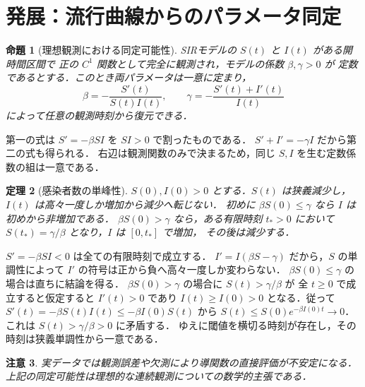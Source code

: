 \documentclass[a5paper,10pt,onecolumn]{jsarticle}
\makeatletter
\theoremstyle{mathnotetheorem}
\newtheorem{theorem}{定理}[section]
\newtheorem{proposition}[theorem]{命題}
\newtheorem{remark}[theorem]{注意}
\renewcommand{\proofname}{証明}
\renewenvironment{proof}[1][\proofname]{%
  \par\pushQED{\qed}\normalfont\topsep4\p@\@plus2\p@\relax
  \trivlist\item[\hskip\labelsep\bfseries #1]\ignorespaces
}{\popQED\endtrivlist\@endpefalse}
\makeatother
\begin{document}
\section{発展：流行曲線からのパラメータ同定}
\begin{proposition}[理想観測における同定可能性]
SIRモデルの $S(t)$ と $I(t)$ がある開時間区間で
正の $C^1$ 関数として完全に観測され，モデルの係数 $\beta,\gamma>0$ が
定数であるとする．このとき両パラメータは一意に定まり，
\[
 \beta=-\frac{S'(t)}{S(t)I(t)},\qquad
 \gamma=-\frac{S'(t)+I'(t)}{I(t)}
\]
によって任意の観測時刻から復元できる．
\end{proposition}
\begin{proof}
第一の式は $S'=-\beta SI$ を $S I>0$ で割ったものである．
$S'+I'=-\gamma I$ だから第二の式も得られる．
右辺は観測関数のみで決まるため，同じ $S,I$ を生む定数係数の組は一意である．
\end{proof}
\begin{theorem}[感染者数の単峰性]
$S(0),I(0)>0$ とする．$S(t)$ は狭義減少し，
$I(t)$ は高々一度しか増加から減少へ転じない．
初めに $\beta S(0)\le\gamma$ なら $I$ は初めから非増加である．
$\beta S(0)>\gamma$ なら，ある有限時刻 $t_*>0$ において
$S(t_*)=\gamma/\beta$ となり，$I$ は $[0,t_*]$ で増加，
その後は減少する．
\end{theorem}
\begin{proof}
$S'=-\beta SI<0$ は全ての有限時刻で成立する．
$I'=I(\beta S-\gamma)$ だから，$S$ の単調性によって
$I'$ の符号は正から負へ高々一度しか変わらない．
$\beta S(0)\le\gamma$ の場合は直ちに結論を得る．
$\beta S(0)>\gamma$ の場合に $S(t)>\gamma/\beta$ が
全 $t\ge0$ で成立すると仮定すると $I'(t)>0$ であり
$I(t)\ge I(0)>0$ となる．従って
$S'(t)=-\beta S(t)I(t)\le-\beta I(0)S(t)$ から
$S(t)\le S(0)e^{-\beta I(0)t}\to0$．
これは $S(t)>\gamma/\beta>0$ に矛盾する．
ゆえに閾値を横切る時刻が存在し，その時刻は狭義単調性から一意である．
\end{proof}
\begin{remark}
実データでは観測誤差や欠測により導関数の直接評価が不安定になる．
上記の同定可能性は理想的な連続観測についての数学的主張である．
\end{remark}
\end{document}
